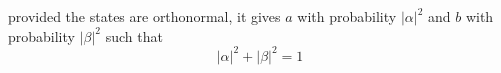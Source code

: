 \documentclass[preview]{standalone}
\begin{document}
\begin{center}
provided the states are orthonormal, it gives $a$ with probability $|\alpha|^2$ and $b$ with probability $|\beta|^2$ such that $$|\alpha|^2 + |\beta|^2 = 1$$
\end{center}
\end{document}
